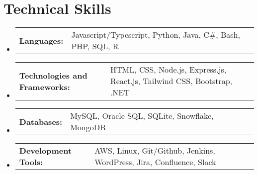 \documentclass[letterpaper,11pt]{article}
\makeatletter
\newcommand{\resumeSubItem}[2]{ 
  \item
    \begin{tabular*}{\textwidth}{@{}l p{\dimexpr\textwidth-1.5cm}@{}}{\small\textbf{#1}}\hspace{0.5em} & {\small #2} \\ 
    \end{tabular*}\vspace{-6pt}
}
\newcommand{\resumeSubHeadingListStart}{\begin{itemize}[leftmargin=0.0in, label={}]}
\newcommand{\resumeSubHeadingListEnd}{\end{itemize}}
\makeatother
\begin{document}
\section{Technical Skills}
  \resumeSubHeadingListStart
    \resumeSubItem{Languages:}
      {Javascript/Typescript, Python, Java, C\#, Bash, PHP, SQL, R}
    \resumeSubItem{Technologies and Frameworks:}
      {HTML, CSS, Node.js, Express.js, React.js, Tailwind CSS, Bootstrap, .NET}
    \resumeSubItem{Databases:}
      {MySQL, Oracle SQL, SQLite, Snowflake, MongoDB}
    \resumeSubItem{Development Tools:}
      {AWS, Linux, Git/Github, Jenkins, WordPress, Jira, Confluence, Slack}
  \resumeSubHeadingListEnd
\end{document}
